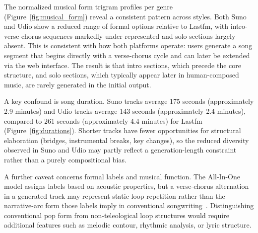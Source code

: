 \documentclass{article}
\begin{document}
The normalized musical form trigram profiles per genre (Figure~\ref{fig:musical_form}) reveal a consistent pattern across styles. Both Suno and Udio show a reduced range of formal options relative to Lastfm, with intro-verse-chorus sequences markedly under-represented and solo sections largely absent. This is consistent with how both platforms operate: users generate a song segment that begins directly with a verse-chorus cycle and can later be extended via the web interface. The result is that intro sections, which precede the core structure, and solo sections, which typically appear later in human-composed music, are rarely generated in the initial output.

A key confound is song duration. Suno tracks average 175 seconds (approximately 2.9 minutes) and Udio tracks average 143 seconds (approximately 2.4 minutes), compared to 261 seconds (approximately 4.4 minutes) for Lastfm (Figure~\ref{fig:durations}). Shorter tracks have fewer opportunities for structural elaboration (bridges, instrumental breaks, key changes), so the reduced diversity observed in Suno and Udio may partly reflect a generation-length constraint rather than a purely compositional bias.

A further caveat concerns formal labels and musical function. The All-In-One model assigns labels based on acoustic properties, but a verse-chorus alternation in a generated track may represent static loop repetition rather than the narrative-arc form those labels imply in conventional songwriting~\citep{nieto2020audio}. Distinguishing conventional pop form from non-teleological loop structures would require additional features such as melodic contour, rhythmic analysis, or lyric structure.

\end{document}

